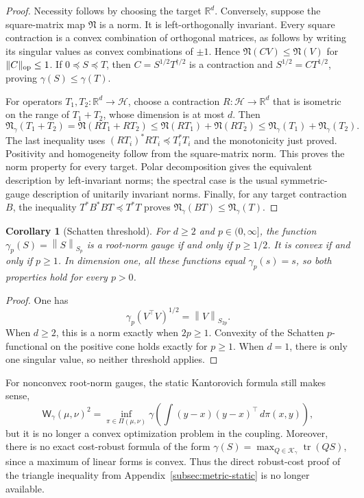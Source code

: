 \documentclass{article}
\newtheorem{corollary}[theorem]{Corollary}
\newcommand{\R}{\mathbb{R}}
\newcommand{\Wg}{\mathsf{W}_{\gamma}}
\newcommand{\tr}{\operatorname{tr}}
\newcommand{\norm}[1]{\left\lVert #1 \right\rVert}
\newcommand{\cK}{\mathcal K_\gamma}
\begin{document}
\begin{proof}
Necessity follows by choosing the target $\R^d$. Conversely, suppose the
square-matrix map $\mathfrak N$ is a norm. It is left-orthogonally invariant.
Every square contraction is a convex combination of orthogonal matrices,
as follows by writing its singular values as convex combinations of $\pm1$.
Hence $\mathfrak N(CV)\le\mathfrak N(V)$ for $\|C\|_{\rm op}\le1$.
If $0\preceq S\preceq T$, then
$C=S^{1/2}T^{\dagger/2}$ is a contraction and $S^{1/2}=CT^{1/2}$, proving
$\gamma(S)\le\gamma(T)$.

For operators $T_1,T_2:\R^d\to\mathcal H$, choose a contraction
$R:\mathcal H\to\R^d$ that is isometric on the range of $T_1+T_2$, whose
dimension is at most $d$. Then
\[
 \mathfrak N_\gamma(T_1+T_2)
 =\mathfrak N(RT_1+RT_2)
 \le\mathfrak N(RT_1)+\mathfrak N(RT_2)
 \le\mathfrak N_\gamma(T_1)+\mathfrak N_\gamma(T_2).
\]
The last inequality uses $(RT_i)^*RT_i\preceq T_i^*T_i$ and the monotonicity
just proved. Positivity and homogeneity follow from the square-matrix norm.
This proves the norm property for every target. Polar decomposition gives
the equivalent description by left-invariant norms; the spectral case is
the usual symmetric-gauge description of unitarily invariant norms.
Finally, for any target contraction $B$, the inequality
$T^*B^*BT\preceq T^*T$ proves
$\mathfrak N_\gamma(BT)\le\mathfrak N_\gamma(T)$.
\end{proof}

\begin{corollary}[Schatten threshold]
\label{cor:root-norm-schatten}
For $d\ge2$ and $p\in(0,\infty]$, the function
$\gamma_p(S)=\norm{S}_{S_p}$ is a root-norm gauge if and only if $p\ge1/2$.
It is convex if and only if $p\ge1$. In dimension one, all these functions
equal $\gamma_p(s)=s$, so both properties hold for every $p>0$.
\end{corollary}

\begin{proof}
One has
$$
    \gamma_p(V^\top V)^{1/2}=\norm{V}_{S_{2p}}.
$$
When $d\ge2$, this is a norm exactly when $2p\ge1$. Convexity of the Schatten
$p$-functional on the positive cone holds exactly for $p\ge1$. When $d=1$,
there is only one singular value, so neither threshold applies.
\end{proof}

For nonconvex root-norm gauges, the static Kantorovich formula still makes
sense,
$$
    \Wg(\mu,\nu)^2
    =
    \inf_{\pi\in\Pi(\mu,\nu)}
    \gamma\!\left(\int (y-x)(y-x)^\top\,d\pi(x,y)\right),
$$
but it is no longer a convex optimization problem in the coupling.  Moreover,
there is no exact cost-robust formula of the form
$\gamma(S)=\max_{Q\in\cK}\tr(QS)$, since a maximum of linear forms is convex.
Thus the direct robust-cost proof of the triangle inequality from
Appendix~\ref{subsec:metric-static} is no longer available.
\end{document}
